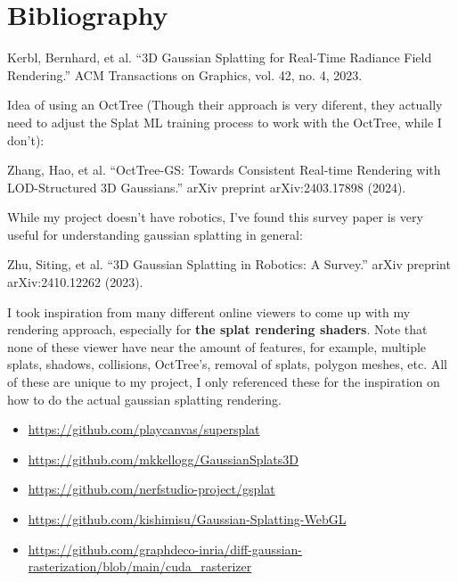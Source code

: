 \documentclass {article}
\begin{document}
\section{Bibliography}
     Kerbl, Bernhard, et al. “3D Gaussian Splatting for Real-Time Radiance Field Rendering.” ACM Transactions on Graphics, vol. 42, no. 4, 2023.

     Idea of using an OctTree (Though their approach is very diferent, they actually need to adjust the Splat ML training process to work with the OctTree, while I don't):

     Zhang, Hao, et al. “OctTree-GS: Towards Consistent Real-time Rendering with LOD-Structured 3D Gaussians.” arXiv preprint arXiv:2403.17898 (2024).


     While my project doesn't have robotics, I've found this survey paper is very useful for understanding gaussian splatting in general:

     Zhu, Siting, et al. “3D Gaussian Splatting in Robotics: A Survey.” arXiv preprint arXiv:2410.12262 (2023).


     I took inspiration from many different online viewers to come up with my rendering approach, especially for \textbf{the splat rendering shaders}. Note that none of these viewer have near the amount of features, for example, multiple splats, shadows, collisions, OctTree's, removal of splats, polygon meshes, etc. All of these are unique to my project, I only referenced these for the inspiration on how to do the actual gaussian splatting rendering.
     \begin{itemize}
          \item \href{https://github.com/playcanvas/supersplat}{https://github.com/playcanvas/supersplat}
          \item \href{https://github.com/mkkellogg/GaussianSplats3D}{https://github.com/mkkellogg/GaussianSplats3D}
          \item \href{https://github.com/nerfstudio-project/gsplat}{https://github.com/nerfstudio-project/gsplat}
          \item \href{https://github.com/kishimisu/Gaussian-Splatting-WebGL}{https://github.com/kishimisu/Gaussian-Splatting-WebGL}
          \item \href{https://github.com/graphdeco-inria/diff-gaussian-rasterization/blob/main/cuda\_rasterizer}{https://github.com/graphdeco-inria/diff-gaussian-rasterization/blob/main/cuda\_rasterizer}
     \end{itemize}

\newpage
\end{document}
